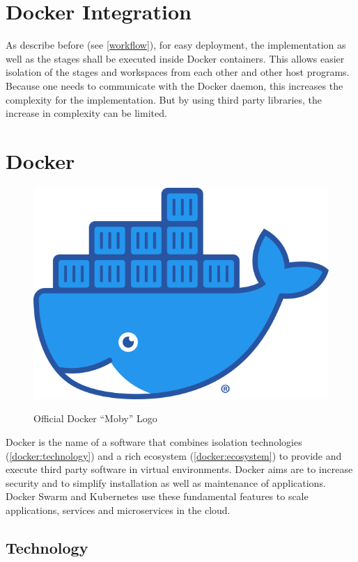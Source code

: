 \section{Docker Integration}

As describe before (see \autoref{workflow}), for easy deployment, the implementation as well as the stages shall be executed inside Docker\cite{docker:main} containers.
This allows easier isolation of the stages and workspaces from each other and other host programs.
Because one needs to communicate with the Docker daemon, this increases the complexity for the implementation.
But by using third party libraries, the increase in complexity can be limited.


\section{Docker}
\label{docker:image}

\begin{figure}
	\centering
	\includegraphics[width=.2\textwidth]{res/docker-Moby-logo.png}
	\label{docker:logo}
	\caption{Official Docker \enquote{Moby} Logo\cite{docker:logo}}
	\vspace{1cm}
\end{figure}

Docker is the name of a software that combines isolation technologies (\autoref{docker:technology}) and a rich ecosystem (\autoref{docker:ecosystem}) to provide and execute third party software in virtual environments.
Docker aims are to increase security and to simplify installation as well as maintenance of applications.
Docker Swarm\cite{docker:swarm:key-concepts} and Kubernetes\cite{kubernetes:overview} use these fundamental features to scale applications, services and microservices in the cloud.


\subsection{Technology}
\label{docker:technology}

